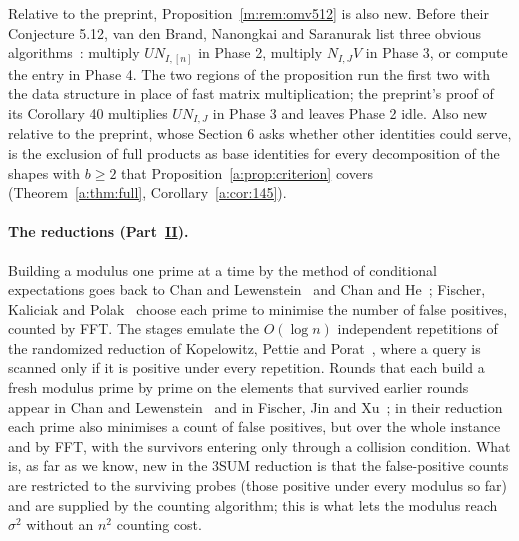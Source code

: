 \documentclass[11pt]{article}
\theoremstyle{definition}
\theoremstyle{remark}
\begin{document}
Relative to the preprint, Proposition~\ref{m:rem:omv512} is also new. Before their Conjecture 5.12, van den Brand, Nanongkai and Saranurak list three obvious algorithms~\cite[p.~31]{BNS19}: multiply $UN_{I,[n]}$ in Phase 2, multiply $N_{I,J}V$ in Phase 3, or compute the entry in Phase 4. The two regions of the proposition run the first two with the data structure in place of fast matrix multiplication; the preprint's proof of its Corollary 40 multiplies $UN_{I,J}$ in Phase 3 and leaves Phase 2 idle. Also new relative to the preprint, whose Section 6 asks whether other identities could serve, is the exclusion of full products as base identities for every decomposition of the shapes with $b\ge2$ that Proposition~\ref{a:prop:criterion} covers (Theorem~\ref{a:thm:full}, Corollary~\ref{a:cor:145}).

\paragraph{The reductions (Part~\hyperref[m:partII]{II}).} Building a modulus one prime at a time by the method of conditional expectations goes back to Chan and Lewenstein~\cite[Section~8]{CL15} and Chan and He~\cite{CH20}; Fischer, Kaliciak and Polak~\cite[Lemma~3.2]{FKP24} choose each prime to minimise the number of false positives, counted by FFT. The stages emulate the $O(\log n)$ independent repetitions of the randomized reduction of Kopelowitz, Pettie and Porat~\cite{KPP16}, where a query is scanned only if it is positive under every repetition. Rounds that each build a fresh modulus prime by prime on the elements that survived earlier rounds appear in Chan and Lewenstein~\cite[Section~8]{CL15} and in Fischer, Jin and Xu~\cite[Lemma~3.2]{FJX25}; in their reduction each prime also minimises a count of false positives, but over the whole instance and by FFT, with the survivors entering only through a collision condition. What is, as far as we know, new in the 3SUM reduction is that the false-positive counts are restricted to the surviving probes (those positive under every modulus so far) and are supplied by the counting algorithm; this is what lets the modulus reach $\sigma^2$ without an $n^2$ counting cost.
\end{document}
